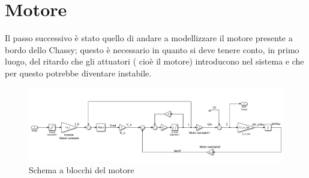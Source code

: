 \section{Motore}
Il passo successivo è stato quello di andare a modellizzare il motore presente a bordo dello Chassy; questo è necessario in quanto si deve tenere conto, in primo luogo, del ritardo che gli attuatori ( cioè il motore) introducono nel sistema e che per questo potrebbe diventare instabile.
\begin{figure}[H]
	\centering   	
	\includegraphics[width=1\textwidth]{Immagini/motor.png}
	\caption{Schema a blocchi del motore}
	\label{fig:motor}
\end{figure}

